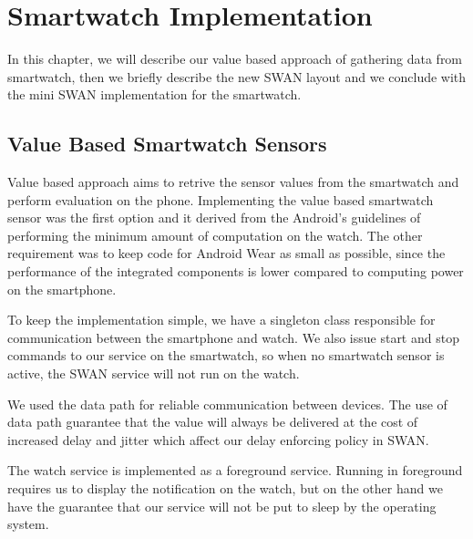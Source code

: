 
\chapter{Smartwatch Implementation} %

\label{Chapter5} %

In this chapter, we will describe our value based approach of gathering data from
smartwatch, then we briefly describe the new SWAN layout and we conclude with the mini SWAN implementation for the smartwatch.

\section{Value Based Smartwatch Sensors }
Value based approach aims to retrive the sensor values from the smartwatch and perform evaluation on the phone.
Implementing the value based smartwatch sensor was the first option and it derived
from the Android's guidelines of performing the minimum amount of computation on the watch.
The other requirement was to keep code for Android Wear as small as possible, since the performance of the integrated components is lower compared to computing power on the smartphone.

To keep the implementation simple, we have a singleton class  responsible for communication between the smartphone and watch.
We also issue start and stop commands to our service on the smartwatch,
so when no smartwatch sensor is active, the SWAN service will not run on the watch.

We used the data path\cite{android_wear_datapath} for reliable communication between devices. The use of data path guarantee that the value will always be delivered at the cost of increased delay
and jitter\cite{jitter_ref} which affect our delay enforcing policy in SWAN.

The watch service is implemented as a foreground service\cite{foreground_service}.
Running in foreground requires us to display the notification on the watch, but on the other hand we have the 
guarantee that our service will not be put to sleep by the operating system. 

